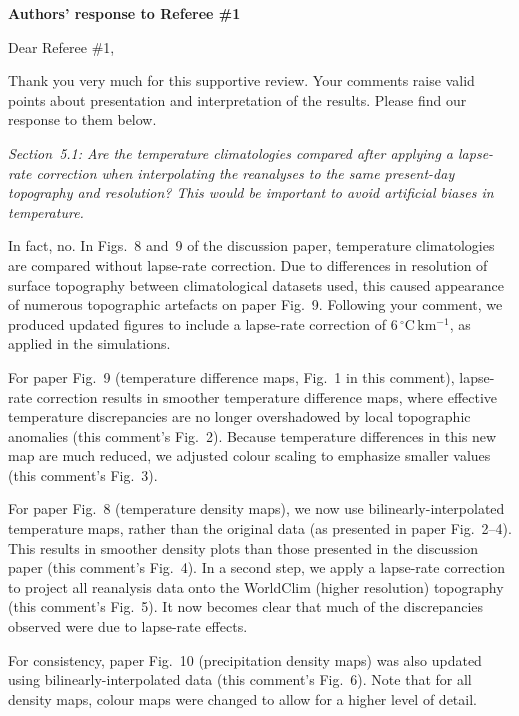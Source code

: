 \documentclass[10pt]{article}
\begin{document}
\textbf{Authors' response to Referee {\#}1}
\bigskip

\def\referee#1{\bigskip\textcolor{journalname}{\textit{#1}}}

Dear Referee {\#}1,

Thank you very much for this supportive review. Your comments raise valid points about presentation and interpretation of the results. Please find our response to them below.

\referee{Section~5.1: Are the temperature climatologies compared after applying a lapse-rate correction when interpolating the reanalyses to the same present-day topography and resolution? This would be important to avoid artificial biases in temperature.}

In fact, no. In Figs.~8 and~9 of the discussion paper, temperature climatologies are compared without lapse-rate correction. Due to differences in resolution of surface topography between climatological datasets used, this caused appearance of numerous topographic artefacts on paper Fig.~9. Following your comment, we produced updated figures to include a lapse-rate correction of 6\,{$^\circ$}C\,km$^{-1}$, as applied in the simulations.

For paper Fig.~9 (temperature difference maps, Fig.~1 in this comment), lapse-rate correction results in smoother temperature difference maps, where effective temperature discrepancies are no longer overshadowed by local topographic anomalies (this comment's Fig.~2). Because temperature differences in this new map are much reduced, we adjusted colour scaling to emphasize smaller values (this comment's Fig.~3).

For paper Fig.~8 (temperature density maps), we now use bilinearly-interpolated temperature maps, rather than the original data (as presented in paper Fig.~2--4). This results in smoother density plots than those presented in the discussion paper (this comment's Fig.~4). In a second step, we apply a lapse-rate correction to project all reanalysis data onto the WorldClim (higher resolution) topography (this comment's Fig.~5). It now becomes clear that much of the discrepancies observed were due to lapse-rate effects.

For consistency, paper Fig.~10 (precipitation density maps) was also updated using bilinearly-interpolated data (this comment's Fig.~6). Note that for all density maps, colour maps were changed to allow for a higher level of detail.
\end{document}
